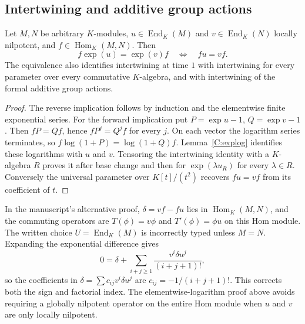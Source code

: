 \subsection{Intertwining and additive group actions}
\begin{theorem}
\label{C:intertwine}
Let $M,N$ be arbitrary $K$-modules, $u\in\operatorname{End}_K(M)$ and $v\in\operatorname{End}_K(N)$ locally nilpotent, and $f\in\operatorname{Hom}_K(M,N)$. Then
\[
f\exp(u)=\exp(v)f\quad\Longleftrightarrow\quad fu=vf.
\]
The equivalence also identifies intertwining at time $1$ with intertwining for every parameter over every commutative $K$-algebra, and with intertwining of the formal additive group actions.
\end{theorem}
\begin{proof}
The reverse implication follows by induction and the elementwise finite exponential series. For the forward implication put $P=\exp u-1$, $Q=\exp v-1$. Then $fP=Qf$, hence $fP^j=Q^jf$ for every $j$. On each vector the logarithm series terminates, so
$f\log(1+P)=\log(1+Q)f$. Lemma~\ref{C:explog} identifies these logarithms with $u$ and $v$. Tensoring the intertwining identity with a $K$-algebra $R$ proves it after base change and then for $\exp(\lambda u_R)$ for every $\lambda\in R$. Conversely the universal parameter over $K[t]/(t^2)$ recovers $fu=vf$ from its coefficient of $t$.
\end{proof}

\begin{remark}
\label{C:proof-correction}
In the manuscript's alternative proof, $\delta=vf-fu$ lies in $\operatorname{Hom}_K(M,N)$, and the commuting operators are $T(\phi)=v\phi$ and $T'(\phi)=\phi u$ on this Hom module. The written choice $U=\operatorname{End}_K(M)$ is incorrectly typed unless $M=N$. Expanding the exponential difference gives
\[
0=\delta+\sum_{i+j\geq1}\frac{v^i\delta u^j}{(i+j+1)!},
\]
so the coefficients in $\delta=\sum c_{ij}v^i\delta u^j$ are $c_{ij}=-1/(i+j+1)!$. This corrects both the sign and factorial index. The elementwise-logarithm proof above avoids requiring a globally nilpotent operator on the entire Hom module when $u$ and $v$ are only locally nilpotent.
\end{remark}


